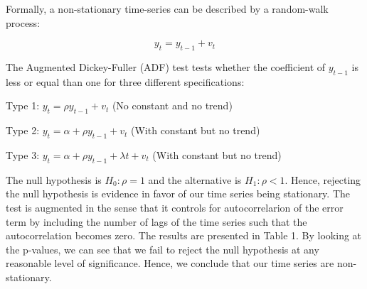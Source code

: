 \documentclass[
]{article}
\begin{document}
Formally, a non-stationary time-series can be described by a random-walk
process:

\[y_t=y_{t-1}+v_t\]

The Augmented Dickey-Fuller (ADF) test tests whether the coefficient of
\(y_{t-1}\) is less or equal than one for three different
specifications:

Type 1: \(y_t=\rho y_{t-1}+v_t\) (No constant and no trend)

Type 2: \(y_t=\alpha + \rho y_{t-1}+v_t\) (With constant but no trend)

Type 3: \(y_t=\alpha + \rho y_{t-1} +\lambda t+v_t\) (With constant but
no trend)

The null hypothesis is \(H_0:\rho=1\) and the alternative is
\(H_1: \rho <1\). Hence, rejecting the null hypothesis is evidence in
favor of our time series being stationary. The test is augmented in the
sense that it controls for autocorrelarion of the error term by
including the number of lags of the time series such that the
autocorrelation becomes zero. The results are presented in Table 1. By
looking at the p-values, we can see that we fail to reject the null
hypothesis at any reasonable level of significance. Hence, we conclude
that our time series are non-stationary.
\end{document}
